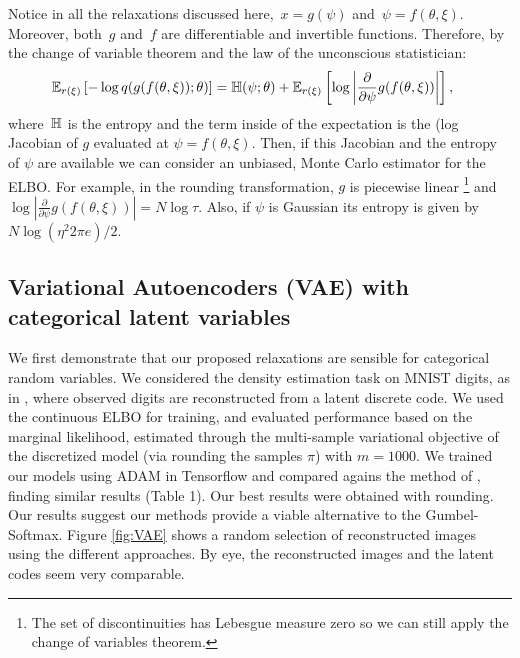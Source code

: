  Notice in all the relaxations
discussed here,~${x = g(\psi)}$ and~${\psi = f(\theta,
  \xi)}$. Moreover, both~$g$ and~$f$ are differentiable and invertible
functions. Therefore, by the change of variable theorem and the law of
the unconscious statistician:
\begin{align}
  \mathbb{E}_{r(\xi)} \left[- \log q(g(f(\theta, \xi)); \theta) \right]
  &= \mathbb{H}(\psi; \theta)+
    \mathbb{E}_{r(\xi)}\left[\log \left|\frac{\partial}{\partial \psi} g(f(\theta, \xi)) \right| \right],
  \end{align}
where~$\mathbb{H}$ is the entropy and the term inside of the expectation
is the (log Jacobian of $g$ evaluated at $\psi =
f(\theta,\xi)$. Then, if this Jacobian and the entropy of $\psi$ are
available we can consider an unbiased, Monte Carlo estimator for the ELBO.
For example, in the rounding transformation, $g$ is piecewise linear
\footnote{The set of discontinuities has Lebesgue measure zero so we
  can still apply the change of variables theorem.} and
$\log | \tfrac{\partial}{\partial \psi} g(f(\theta, \xi)) |= N\log
\tau$. Also, if $\psi$ is Gaussian its entropy is given by
$N\log(\eta^2 2\pi e )/2$.


\subsection{Variational Autoencoders (VAE) with categorical latent variables}
We first demonstrate that our proposed relaxations are sensible for
categorical random variables. We considered the density estimation
task on MNIST digits, as in \cite{maddison2016concrete,
  jang2016categorical}, where observed digits are reconstructed from a
latent discrete code. We used the continuous ELBO for training, and
evaluated performance based on the marginal likelihood, estimated
through the multi-sample variational objective of the discretized
model (via rounding the samples $\pi$) with $m=1000$. We trained our
models using ADAM in Tensorflow and compared agains the method of
\cite{jang2016categorical}, finding similar results (Table 1). Our
best results were obtained with rounding. Our results suggest our
methods provide a viable alternative to the Gumbel-Softmax. Figure
\ref{fig:VAE} shows a random selection of reconstructed images using
the different approaches.  By eye, the reconstructed images
and the latent codes seem very comparable. 


